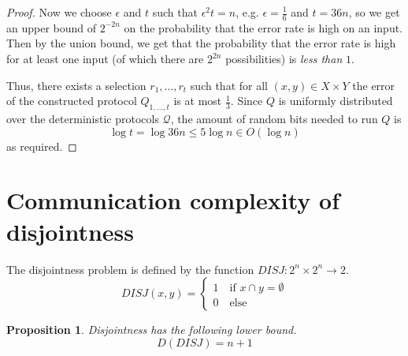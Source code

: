\documentclass[letterpaper,11pt]{article}
\newtheorem{prop}{Proposition}
\begin{document}
\begin{proof}
    Now we choose $\epsilon$ and $t$ such that $\epsilon^2 t = n$, e.g.
    $\epsilon = \frac{1}{6}$ and $t = 36n$, so we get an upper bound of
    $2^{-2n}$ on the probability that the error rate is high on an input. Then
    by the union bound, we get that the probability that the error rate is high
    for at least one input (of which there are $2^{2n}$ possibilities) is
    \emph{less than} $1$.

    Thus, there exists a selection $r_1, \ldots, r_t$ such that for all $(x, y)
    \in X \times Y$ the error of the constructed protocol $Q_{1,\ldots,t}$ is
    at most $\frac{1}{3}$. Since $Q$ is uniformly distributed over the
    deterministic protocols $\mathcal{Q}$, the amount of random bits needed to
    run $Q$ is
    \begin{equation*}
        \log t = \log {36n} \leq 5 \log n \in O(\log n)
    \end{equation*}
    as required.
\end{proof}

\section{Communication complexity of disjointness}

The disjointness problem is defined by the function
$DISJ : 2^n \times 2^n \to 2$.
\begin{equation*}
    DISJ(x, y) = \begin{cases}
        1 \quad \text{if } x \cap y = \emptyset \\
        0 \quad \text{else}
    \end{cases}
\end{equation*}

\begin{prop}
    Disjointness has the following lower bound.
    \begin{equation*}
        D(DISJ) = n + 1
    \end{equation*}
\end{prop}
\end{document}
